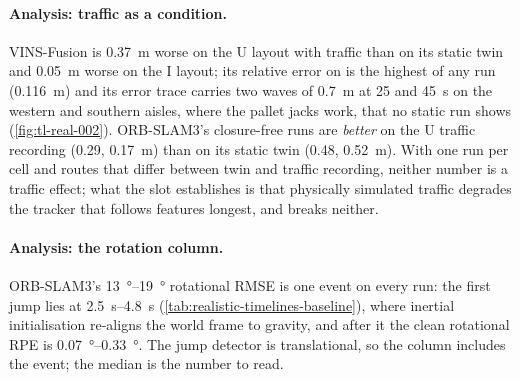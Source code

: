 \documentclass[11pt,a4paper,notitlepage]{report}
\begin{document}
\paragraph{Analysis: traffic as a condition.} VINS-Fusion is \SI{0.37}{\metre}
worse on the U layout with traffic than on its static twin and \SI{0.05}{\metre}
worse on the I layout; its relative error on  is the
highest of any run (\SI{0.116}{\metre}) and its error trace carries two
waves of \SI{0.7}{\metre} at \SI{25}{} and \SI{45}{\second} on the western and
southern aisles, where the pallet jacks work, that no static run shows
(\cref{fig:tl-real-002}). ORB-SLAM3's closure-free runs are \emph{better} on
the U traffic recording (\SI{0.29}{}, \SI{0.17}{\metre}) than on its static
twin (\SI{0.48}{}, \SI{0.52}{\metre}). With one run per cell and routes that
differ between twin and traffic recording, neither number is a traffic effect;
what the slot establishes is that physically simulated traffic degrades the
tracker that follows features longest, and breaks neither.

\paragraph{Analysis: the rotation column.} ORB-SLAM3's \SIrange{13}{19}{\degree}
rotational RMSE is one event on every run: the first jump lies at
\SIrange{2.5}{4.8}{\second} (\cref{tab:realistic-timelines-baseline}), where
inertial initialisation re-aligns the world frame to gravity, and after it the
clean rotational RPE is \SIrange{0.07}{0.33}{\degree}. The jump detector is
translational, so the column includes the event; the median is the number to
read.

\end{document}
